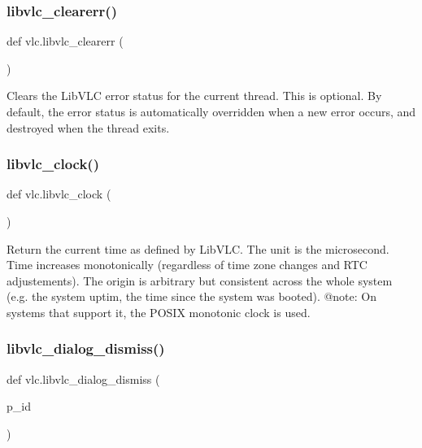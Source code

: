 \subsubsection{\texorpdfstring{libvlc\+\_\+clearerr()}{libvlc\_clearerr()}}
{\footnotesize\ttfamily def vlc.\+libvlc\+\_\+clearerr (\begin{DoxyParamCaption}{ }\end{DoxyParamCaption})}

\begin{DoxyVerb}Clears the LibVLC error status for the current thread. This is optional.
By default, the error status is automatically overridden when a new error
occurs, and destroyed when the thread exits.
\end{DoxyVerb}
 \mbox{\label{namespacevlc_a87be950b9641fe8db6fdbbbf35a472ab}} 
\subsubsection{\texorpdfstring{libvlc\+\_\+clock()}{libvlc\_clock()}}
{\footnotesize\ttfamily def vlc.\+libvlc\+\_\+clock (\begin{DoxyParamCaption}{ }\end{DoxyParamCaption})}

\begin{DoxyVerb}Return the current time as defined by LibVLC. The unit is the microsecond.
Time increases monotonically (regardless of time zone changes and RTC
adjustements).
The origin is arbitrary but consistent across the whole system
(e.g. the system uptim, the time since the system was booted).
@note: On systems that support it, the POSIX monotonic clock is used.
\end{DoxyVerb}
 \mbox{\label{namespacevlc_a27caf08ba5684529165692463fc5d346}} 
\subsubsection{\texorpdfstring{libvlc\+\_\+dialog\+\_\+dismiss()}{libvlc\_dialog\_dismiss()}}
{\footnotesize\ttfamily def vlc.\+libvlc\+\_\+dialog\+\_\+dismiss (\begin{DoxyParamCaption}\item[{}]{p\+\_\+id }\end{DoxyParamCaption})}

